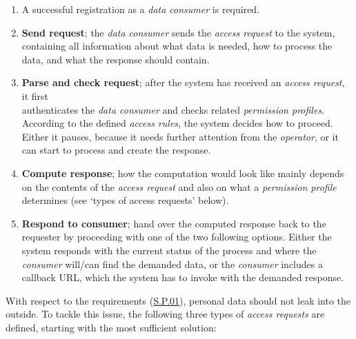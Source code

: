 \documentclass[12pt,english,a4paper,titlepage,cleardoublepage=empty,dottedtoc]{report}
\begin{document}
\begin{enumerate}
\def\labelenumi{\arabic{enumi})}
\setcounter{enumi}{-1}
\item
  A successful registration as a \emph{data consumer} is required.
\item
  \textbf{Send request}; the \emph{data consumer} sends the \emph{access
  request} to the system, containing all information about what data is
  needed, how to process the data, and what the response should contain.
\item
  \textbf{Parse and check request}; after the system has received an
  \emph{access request}, it first\\
  authenticates the \emph{data consumer} and checks related
  \emph{permission profiles}. According to the defined \emph{access
  rules}, the system decides how to proceed. Either it pauses, because
  it needs further attention from the \emph{operator}, or it can start
  to process and create the response.
\item
  \textbf{Compute response}; how the computation would look like mainly
  depends on the contents of the \emph{access request} and also on what
  a \emph{permission profile} determines (see `types of access requests'
  below).
\item
  \textbf{Respond to consumer}; hand over the computed response back to
  the requester by proceeding with one of the two following options.
  Either the system responds with the current status of the process and
  where the \emph{consumer} will/can find the demanded data, or the
  \emph{consumer} includes a callback URL, which the system has to
  invoke with the demanded response.
\end{enumerate}

With respect to the requirements (\protect\hyperlink{sp01}{S.P.01}),
personal data should not leak into the outside. To tackle this issue,
the following three types of \emph{access requests} are defined,
starting with the most sufficient solution:
\end{document}
